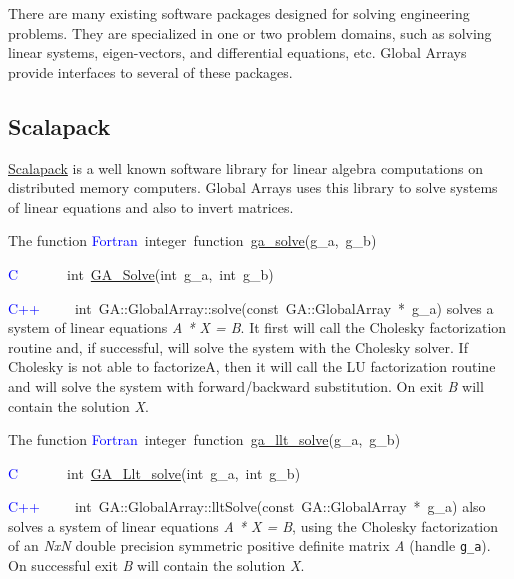 There are many existing software packages designed for solving engineering
problems. They are specialized in one or two problem domains, such
as solving linear systems, eigen-vectors, and differential equations,
etc. Global Arrays provide interfaces to several of these packages. 


\subsection{Scalapack }

\href{http://www.netlib.org/scalapack/index.html}{Scalapack} is a
well known software library for linear algebra computations on distributed
memory computers. Global Arrays uses this library to solve systems
of linear equations and also to invert matrices.

The function
\textcolor{blue}{Fortran}~integer~function~\href{http://www.emsl.pnl.gov/docs/global/ga_ops.html\#ga_solve}{ga\_{}solve}(g\_a,~g\_b)

\textcolor{blue}{C}~~~~~~~int~\href{http://www.emsl.pnl.gov/docs/global/c_nga_ops.html\#ga_solve}{GA\_{}Solve}(int~g\_a,~int~g\_b)~

\textcolor{blue}{C++}~~~~~int~GA::GlobalArray::solve(const~GA::GlobalArray~{*}~g\_a)
solves a system of linear equations \emph{A {*} X = B}. It first will
call the Cholesky factorization routine and, if successful, will solve
the system with the Cholesky solver. If Cholesky is not able to factorizeA,
then it will call the LU factorization routine and will solve the
system with forward/backward substitution. On exit \emph{B} will contain
the solution \emph{X}.

The function
\textcolor{blue}{Fortran}~integer~function~\href{http://www.emsl.pnl.gov/docs/global/ga_ops.html\#ga_llt_solve}{ga\_{}llt\_{}solve}(g\_a,~g\_b)

\textcolor{blue}{C}~~~~~~~int~\href{http://www.emsl.pnl.gov/docs/global/c_nga_ops.html\#ga_llt_solve}{GA\_{}Llt\_{}solve}(int~g\_a,~int~g\_b)

\textcolor{blue}{C++}~~~~~int~GA::GlobalArray::lltSolve(const~GA::GlobalArray~{*}~g\_a)
also solves a system of linear equations \emph{A {*} X = B}, using
the Cholesky factorization of an \emph{NxN} double precision symmetric
positive definite matrix \emph{A} (handle \texttt{g\_a}). On successful
exit \emph{B} will contain the solution \emph{X}.

